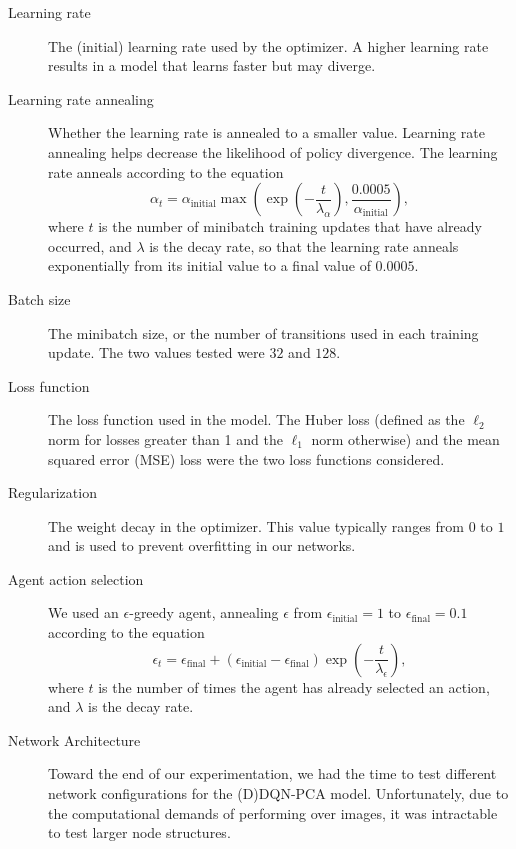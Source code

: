\documentclass[11pt]{article}
\begin{document}
\begin{description}
    \item[Learning rate] The (initial) learning rate used by the optimizer. A higher learning rate results in a model that learns faster but may diverge.
    
    \item[Learning rate annealing] Whether the learning rate is annealed to a smaller value. Learning rate annealing helps decrease the likelihood of policy divergence. The learning rate anneals according to the equation $$\alpha_t = \alpha_\text{initial} \max\left(\exp\left(-\frac{t}{\lambda_\alpha}\right), \frac{0.0005}{\alpha_\text{initial}}\right),$$ where $t$ is the number of minibatch training updates that have already occurred, and $\lambda$ is the decay rate, so that the learning rate anneals exponentially from its initial value to a final value of $0.0005$.
    
    \item[Batch size] The minibatch size, or the number of transitions used in each training update. The two values tested were $32$ and $128$.
    
    \item[Loss function] The loss function used in the model. The Huber loss (defined as the $\ell_2$ norm for losses greater than 1 and the $\ell_1$ norm otherwise) and the mean squared error (MSE) loss were the two loss functions considered.
    
    \item[Regularization] The weight decay in the optimizer. This value typically ranges from $0$ to $1$ and is used to prevent overfitting in our networks.
    
    \item[Agent action selection] We used an $\epsilon$-greedy agent, annealing $\epsilon$ from $\epsilon_\text{initial} = 1$ to $\epsilon_\text{final} = 0.1$ according to the equation $$\epsilon_t = \epsilon_\text{final} + (\epsilon_\text{initial} - \epsilon_\text{final}) \exp\left(-\frac{t}{\lambda_\epsilon}\right),$$ where $t$ is the number of times the agent has already selected an action, and $\lambda$ is the decay rate. 
    
    \item[Network Architecture] Toward the end of our experimentation, we had the time to test different network configurations for the (D)DQN-PCA model. Unfortunately, due to the computational demands of performing over images, it was intractable to test larger node structures.
\end{description}
\end{document}
